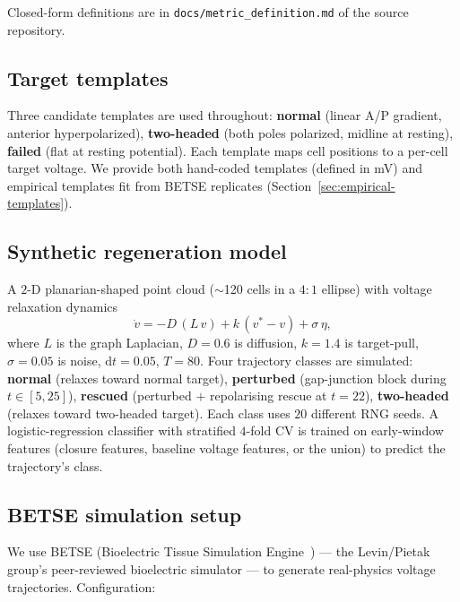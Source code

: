\documentclass[11pt,a4paper]{article}
\begin{document}
Closed-form definitions are in \texttt{docs/metric\_definition.md} of the source repository.

\subsection{Target templates}

Three candidate templates are used throughout: \textbf{normal} (linear A/P gradient, anterior hyperpolarized), \textbf{two-headed} (both poles polarized, midline at resting), \textbf{failed} (flat at resting potential). Each template maps cell positions to a per-cell target voltage. We provide both hand-coded templates (defined in mV) and empirical templates fit from BETSE replicates (Section~\ref{sec:empirical-templates}).

\subsection{Synthetic regeneration model}

A $2$-D planarian-shaped point cloud ($\sim$120 cells in a $4{:}1$ ellipse) with voltage relaxation dynamics
\[
\dot v = -D\,(L\,v) + k\,(v^{*}-v) + \sigma\,\eta,
\]
where $L$ is the graph Laplacian, $D=0.6$ is diffusion, $k=1.4$ is target-pull, $\sigma=0.05$ is noise, $\mathrm{d}t=0.05$, $T=80$. Four trajectory classes are simulated: \textbf{normal} (relaxes toward normal target), \textbf{perturbed} (gap-junction block during $t\in[5,25]$), \textbf{rescued} (perturbed $+$ repolarising rescue at $t=22$), \textbf{two-headed} (relaxes toward two-headed target). Each class uses $20$ different RNG seeds. A logistic-regression classifier with stratified $4$-fold CV is trained on early-window features (closure features, baseline voltage features, or the union) to predict the trajectory's class.

\subsection{BETSE simulation setup}\label{sec:betse}

We use BETSE (Bioelectric Tissue Simulation Engine~\citep{pietak2016exploring,betse_repo}) --- the Levin/Pietak group's peer-reviewed bioelectric simulator --- to generate real-physics voltage trajectories. Configuration:
\end{document}
